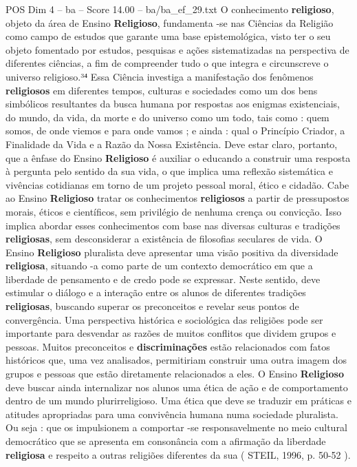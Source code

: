 \begin{textsample}{POS Dim 4 – ba – Score 14.00 – ba/ba\_ef\_29.txt}
O conhecimento \textbf{religioso}, objeto da área de Ensino \textbf{Religioso}, fundamenta -se nas Ciências da Religião como campo de estudos que garante uma base epistemológica, visto ter o seu objeto fomentado por estudos, pesquisas e ações sistematizadas na perspectiva de diferentes ciências, a fim de compreender tudo o que integra e circunscreve o universo religioso.³⁴ Essa Ciência investiga a manifestação dos fenômenos \textbf{religiosos} em diferentes tempos, culturas e sociedades como um dos bens simbólicos resultantes da busca humana por respostas aos enigmas existenciais, do mundo, da vida, da morte e do universo como um todo, tais como : quem somos, de onde viemos e para onde vamos ; e ainda : qual o Princípio Criador, a Finalidade da Vida e a Razão da Nossa Existência.
Deve estar claro, portanto, que a ênfase do Ensino \textbf{Religioso} é auxiliar o educando a construir uma resposta à pergunta pelo sentido da sua vida, o que implica uma reflexão sistemática e vivências cotidianas em torno de um projeto pessoal moral, ético e cidadão.
Cabe ao Ensino \textbf{Religioso} tratar os conhecimentos \textbf{religiosos} a partir de pressupostos morais, éticos e científicos, sem privilégio de nenhuma crença ou convicção.
Isso implica abordar esses conhecimentos com base nas diversas culturas e tradições \textbf{religiosas}, sem desconsiderar a existência de filosofias seculares de vida.
O Ensino \textbf{Religioso} pluralista deve apresentar uma visão positiva da diversidade \textbf{religiosa}, situando -a como parte de um contexto democrático em que a liberdade de pensamento e de credo pode se expressar.
Neste sentido, deve estimular o diálogo e a interação entre os alunos de diferentes tradições \textbf{religiosas}, buscando superar os preconceitos e revelar seus pontos de convergência.
Uma perspectiva histórica e sociológica das religiões pode ser importante para desvendar as razões de muitos conflitos que dividem grupos e pessoas.
Muitos preconceitos e \textbf{discriminações} estão relacionados com fatos históricos que, uma vez analisados, permitiriam construir uma outra imagem dos grupos e pessoas que estão diretamente relacionados a eles.
O Ensino \textbf{Religioso} deve buscar ainda internalizar nos alunos uma ética de ação e de comportamento dentro de um mundo plurirreligioso.
Uma ética que deve se traduzir em práticas e atitudes apropriadas para uma convivência humana numa sociedade pluralista.
Ou seja : que os impulsionem a comportar -se responsavelmente no meio cultural democrático que se apresenta em consonância com a afirmação da liberdade \textbf{religiosa} e respeito a outras religiões diferentes da sua ( STEIL, 1996, p. 50-52 ).

\end{textsample}
